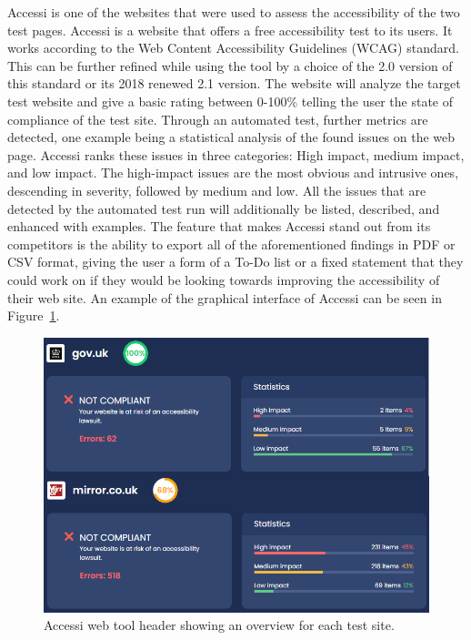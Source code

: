 Accessi \parencite{Accessi} is one of the websites that were used to
assess the accessibility of the two test pages. Accessi is a website
that offers a free accessibility test to its users. It works according
to the Web Content Accessibility Guidelines (WCAG) standard. This can
be further refined while using the tool by a choice of the 2.0 version
of this standard or its 2018 renewed 2.1 version.  The website will
analyze the target test website and give a basic rating between
0-100\% telling the user the state of compliance of the test
site. Through an automated test, further metrics are detected, one
example being a statistical analysis of the found issues on the web
page. Accessi ranks these issues in three categories: High impact,
medium impact, and low impact. The high-impact issues are the most
obvious and intrusive ones, descending in severity, followed by medium
and low. All the issues that are detected by the automated test run
will additionally be listed, described, and enhanced with
examples. The feature that makes Accessi stand out from its
competitors is the ability to export all of the aforementioned
findings in PDF or CSV format, giving the user a form of a To-Do list
or a fixed statement that they could work on if they would be looking
towards improving the accessibility of their web site. An example of
the graphical interface of Accessi can be seen in
Figure~\ref{fig:accessi}.



\begin{figure}[tp]
\centering
\includegraphics[keepaspectratio,width=\linewidth,height=\halfh]
{images/accessi.png}

\caption[Accessi Overview]
{%
Accessi web tool header showing an overview for each test site.
}
\label{fig:accessi}
\end{figure}






